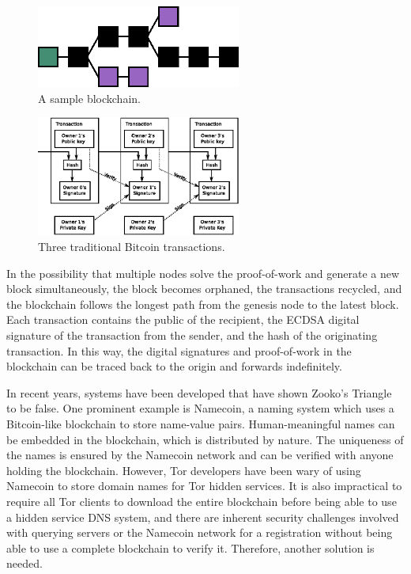 \begin{figure}[htbp]
	\centering
	\includegraphics[width=0.6\textwidth]{images/Blockchain-2.eps}
	\caption{A sample blockchain.}
	\label{fig:figure6}
\end{figure}

\begin{figure}[htbp]
	\centering
	\includegraphics[width=0.6\textwidth]{images/bitcoin_transaction.eps}
	\caption{Three traditional Bitcoin transactions.}
	\label{fig:figure7}
\end{figure}

In the possibility that multiple nodes solve the proof-of-work and generate a new block simultaneously, the block becomes orphaned, the transactions recycled, and the blockchain follows the longest path from the genesis node to the latest block. Each transaction contains the public of the recipient, the ECDSA digital signature of the transaction from the sender, and the hash of the originating transaction. In this way, the digital signatures and proof-of-work in the blockchain can be traced back to the origin and forwards indefinitely. %

In recent years, systems have been developed that have shown Zooko's Triangle to be false. One prominent example is Namecoin, a naming system which uses a Bitcoin-like blockchain to store name-value pairs. Human-meaningful names can be embedded in the blockchain, which is distributed by nature. The uniqueness of the names is ensured by the Namecoin network and can be verified with anyone holding the blockchain. However, Tor developers have been wary of using Namecoin to store domain names for Tor hidden services. It is also impractical to require all Tor clients to download the entire blockchain before being able to use a hidden service DNS system, and there are inherent security challenges involved with querying servers or the Namecoin network for a registration without being able to use a complete blockchain to verify it. Therefore, another solution is needed.

